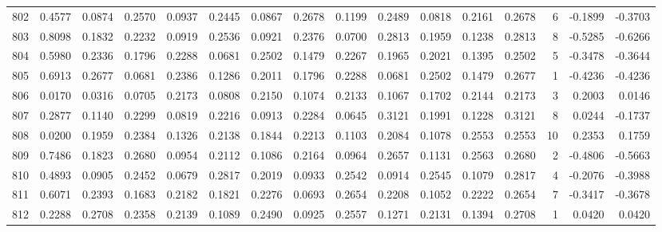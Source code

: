 \begin{tabular}{lrrrrrrrrrrrrrrr}
802 &      0.4577 &  0.0874 &  0.2570 &  0.0937 &  0.2445 &  0.0867 &  0.2678 &  0.1199 &  0.2489 &  0.0818 &   0.2161 &     0.2678 &      6 &                   -0.1899 &                    -0.3703 \\
803 &      0.8098 &  0.1832 &  0.2232 &  0.0919 &  0.2536 &  0.0921 &  0.2376 &  0.0700 &  0.2813 &  0.1959 &   0.1238 &     0.2813 &      8 &                   -0.5285 &                    -0.6266 \\
804 &      0.5980 &  0.2336 &  0.1796 &  0.2288 &  0.0681 &  0.2502 &  0.1479 &  0.2267 &  0.1965 &  0.2021 &   0.1395 &     0.2502 &      5 &                   -0.3478 &                    -0.3644 \\
805 &      0.6913 &  0.2677 &  0.0681 &  0.2386 &  0.1286 &  0.2011 &  0.1796 &  0.2288 &  0.0681 &  0.2502 &   0.1479 &     0.2677 &      1 &                   -0.4236 &                    -0.4236 \\
806 &      0.0170 &  0.0316 &  0.0705 &  0.2173 &  0.0808 &  0.2150 &  0.1074 &  0.2133 &  0.1067 &  0.1702 &   0.2144 &     0.2173 &      3 &                    0.2003 &                     0.0146 \\
807 &      0.2877 &  0.1140 &  0.2299 &  0.0819 &  0.2216 &  0.0913 &  0.2284 &  0.0645 &  0.3121 &  0.1991 &   0.1228 &     0.3121 &      8 &                    0.0244 &                    -0.1737 \\
808 &      0.0200 &  0.1959 &  0.2384 &  0.1326 &  0.2138 &  0.1844 &  0.2213 &  0.1103 &  0.2084 &  0.1078 &   0.2553 &     0.2553 &     10 &                    0.2353 &                     0.1759 \\
809 &      0.7486 &  0.1823 &  0.2680 &  0.0954 &  0.2112 &  0.1086 &  0.2164 &  0.0964 &  0.2657 &  0.1131 &   0.2563 &     0.2680 &      2 &                   -0.4806 &                    -0.5663 \\
810 &      0.4893 &  0.0905 &  0.2452 &  0.0679 &  0.2817 &  0.2019 &  0.0933 &  0.2542 &  0.0914 &  0.2545 &   0.1079 &     0.2817 &      4 &                   -0.2076 &                    -0.3988 \\
811 &      0.6071 &  0.2393 &  0.1683 &  0.2182 &  0.1821 &  0.2276 &  0.0693 &  0.2654 &  0.2208 &  0.1052 &   0.2222 &     0.2654 &      7 &                   -0.3417 &                    -0.3678 \\
812 &      0.2288 &  0.2708 &  0.2358 &  0.2139 &  0.1089 &  0.2490 &  0.0925 &  0.2557 &  0.1271 &  0.2131 &   0.1394 &     0.2708 &      1 &                    0.0420 &                     0.0420 \\

\end{tabular}
